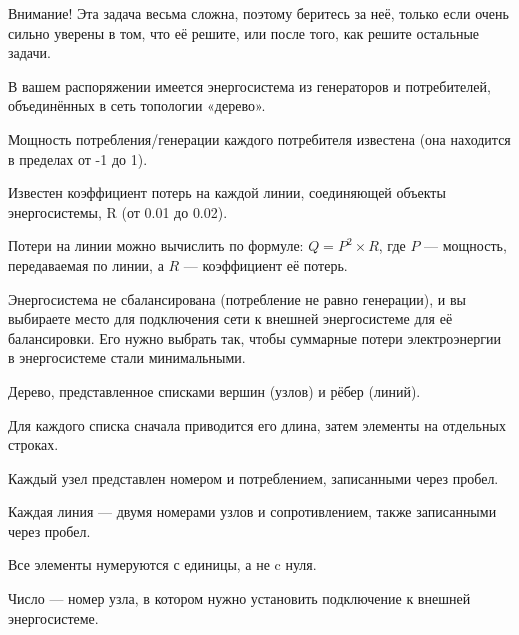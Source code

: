 
Внимание! Эта задача весьма сложна, поэтому беритесь за неё, только если очень сильно уверены в том, что её решите, или после того, как решите остальные задачи.

В вашем распоряжении имеется энергосистема из генераторов и потребителей, объединённых в сеть топологии «дерево».

Мощность потребления/генерации каждого потребителя известена (она находится в пределах от -1 до 1).

Известен коэффициент потерь на каждой линии, соединяющей объекты энергосистемы, R (от 0.01 до 0.02).

Потери на линии можно вычислить по формуле: $Q=P^2\times R$, где $P$ — мощность, передаваемая по линии, а $R$ — коэффициент её потерь.


Энергосистема не сбалансирована (потребление не равно генерации), и вы выбираете место для подключения сети к внешней энергосистеме для её балансировки. Его нужно выбрать так, чтобы суммарные потери электроэнергии в энергосистеме стали минимальными.


Дерево, представленное списками вершин (узлов) и рёбер (линий).

Для каждого списка сначала приводится его длина, затем элементы на отдельных строках.

Каждый узел представлен номером и потреблением, записанными через пробел.

Каждая линия — двумя номерами узлов и сопротивлением, также записанными через пробел.

Все элементы нумеруются с единицы, а не c нуля.

\outputfmtSection

Число — номер узла, в котором нужно установить подключение к внешней энергосистеме.


